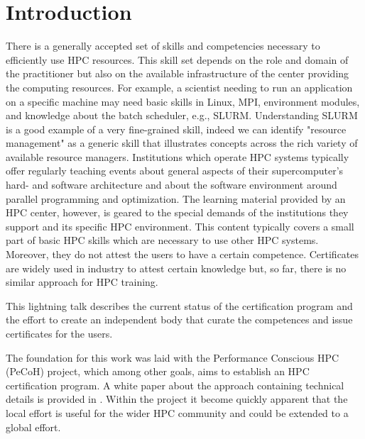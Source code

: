 \documentclass[jocse]{jocseart}
\begin{document}
%
%
\begin{CCSXML}
\end{CCSXML}



\keywords{}

\maketitle

\section{Introduction}

There is a generally accepted set of skills and competencies necessary to efficiently use HPC resources.
This skill set depends on the role and domain of the practitioner but also on the available infrastructure of the center providing the computing resources.
For example, a scientist needing to run an application on a specific machine may need basic skills in Linux, MPI, environment modules, and knowledge about the batch scheduler, e.g., SLURM.
Understanding SLURM is a good example of a very fine-grained skill, indeed we can identify "resource management" as a generic skill that illustrates concepts across the rich variety of available resource managers.
Institutions which operate HPC systems typically offer regularly teaching events about general aspects of their supercomputer's hard- and software architecture and about the software environment around parallel programming and optimization.
The learning material provided by an HPC center, however, is geared to the special demands of the institutions they support and its specific HPC environment.
This content typically covers a small part of basic HPC skills which are necessary to use other HPC systems.
Moreover, they do not attest the users to have a certain competence.
Certificates are widely used in industry to attest certain knowledge but, so far, there is no similar approach for HPC training.

This lightning talk describes the current status of the certification program and the effort to create an independent body that curate the competences and issue certificates for the users.

The foundation for this work was laid with the Performance Conscious HPC (PeCoH) project, which among other goals, aims to establish an HPC certification program.
A white paper about the approach containing technical details is provided in \cite{whitepaper}.
Within the project it become quickly apparent that the local effort is useful for the wider HPC community and could be extended to a global effort.
\end{document}
